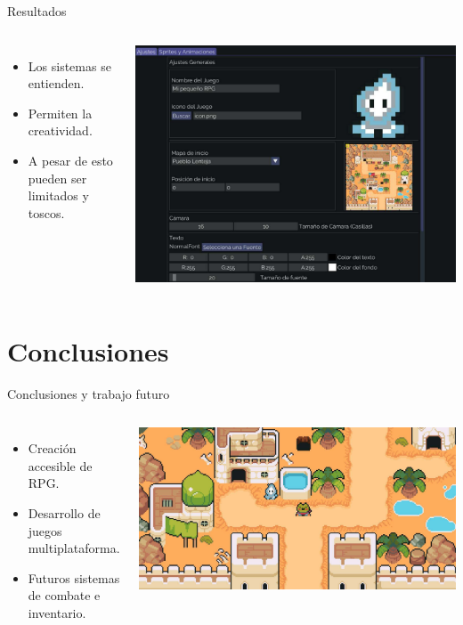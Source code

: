 \documentclass[aspectratio=169]{beamer}
\begin{document}
\begin{frame}{Resultados}
\begin{columns}
	\begin{itemize}
		\item Los sistemas se entienden.
		\item Permiten la creatividad.
		\item A pesar de esto pueden ser limitados y toscos.
	\end{itemize}
	\includegraphics[width=\textwidth]{imgs/pruebas/resultados.pdf}
\end{columns}
\end{frame}

\section{Conclusiones}
\begin{frame}{Conclusiones y trabajo futuro}
\begin{columns}
	\begin{itemize}
		\item Creación accesible de RPG.
		\item Desarrollo de juegos multiplataforma.
		\item Futuros sistemas de combate e inventario.
	\end{itemize}
	\includegraphics[width=\textwidth]{imgs/conclusiones/conclusiones.pdf}
\end{columns}
\end{frame}
\end{document}
